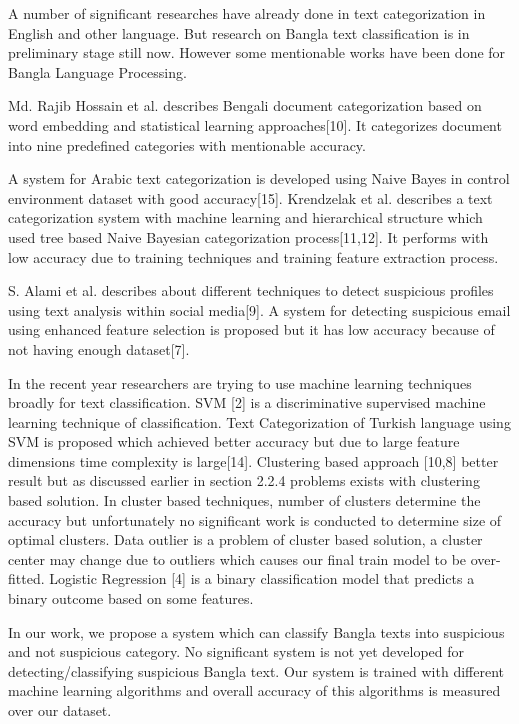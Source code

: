 A number of significant researches have already done in text categorization in English and other language. But research on Bangla text classification is in preliminary stage still now. However some mentionable works have been done for Bangla Language Processing.
\par
\vspace{0.5cm}
 Md. Rajib Hossain et al. describes Bengali document categorization based on word embedding and statistical learning approaches[10]. It categorizes document into nine predefined categories with mentionable accuracy.\par 
 A system for Arabic text categorization is developed using Naive Bayes in control environment dataset with good accuracy[15]. Krendzelak et al. describes a text categorization system with machine learning and hierarchical structure which used tree based Naive Bayesian categorization process[11,12]. It performs with low accuracy due to training techniques and training feature extraction process.\par
 S. Alami et al. describes about different techniques to detect suspicious profiles using text analysis within social media[9]. A system for detecting suspicious email using enhanced feature selection is proposed but it has low accuracy because of not having enough dataset[7].
 \par 
 In the recent year researchers are trying to use machine learning techniques broadly for text classification. SVM [2] is a discriminative supervised machine learning technique of classification. Text Categorization of Turkish language using SVM is proposed which achieved better accuracy but due to large feature dimensions time complexity is large[14]. Clustering based approach [10,8] better result but as discussed earlier in section 2.2.4 problems exists with clustering based solution. In cluster based techniques, number of clusters determine the accuracy but unfortunately no significant work is conducted to determine size of optimal clusters. Data outlier is a problem of cluster based solution, a cluster center may change due to outliers which causes our final train model to be over-fitted. Logistic Regression [4] is a binary classification model that predicts a binary outcome based on some features. \par 
 \vspace{0.5cm}
 \noindent
 In our work, we propose a system which can classify Bangla texts into suspicious and not suspicious category. No significant system is not yet developed for detecting/classifying suspicious Bangla text. Our system is trained with different machine learning algorithms and overall accuracy of this algorithms is measured over our dataset.        